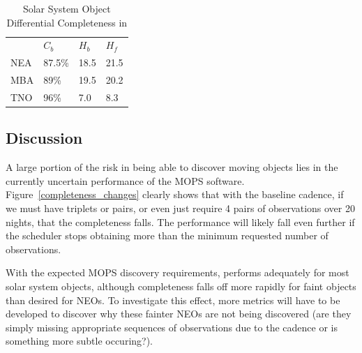 \begin{table}[]
\centering
\caption{Solar System Object Differential Completeness in }
\label{ssoperf}
\begin{tabular}{llll}
    & $C_b$ & $H_b$ & $H_f$ \\
NEA & 87.5\%  & 18.5  & 21.5  \\
MBA & 89\%  & 19.5  & 20.2  \\
TNO & 96\%  & 7.0   & 8.3
\end{tabular}
\end{table}




\subsection{Discussion}
\label{sec:\secname:discussion}

A large portion of the risk in being able to discover moving objects
lies in the currently uncertain performance of the MOPS
software. Figure~\ref{completeness_changes} clearly shows that with
the baseline cadence, if we must have triplets or pairs, or even just
require 4 pairs of observations over 20 nights, that the completeness
falls. The performance will likely fall even further if the scheduler
stops obtaining more than the minimum requested number of observations.

With the expected MOPS discovery requirements,
 performs adequately for most solar system
objects, although completeness falls off more rapidly for faint
objects than desired for NEOs. To investigate this effect, more
metrics will have to be developed to discover why these fainter NEOs
are not being discovered (are they simply missing appropriate
sequences of observations due to the cadence or is something more
subtle occuring?).

